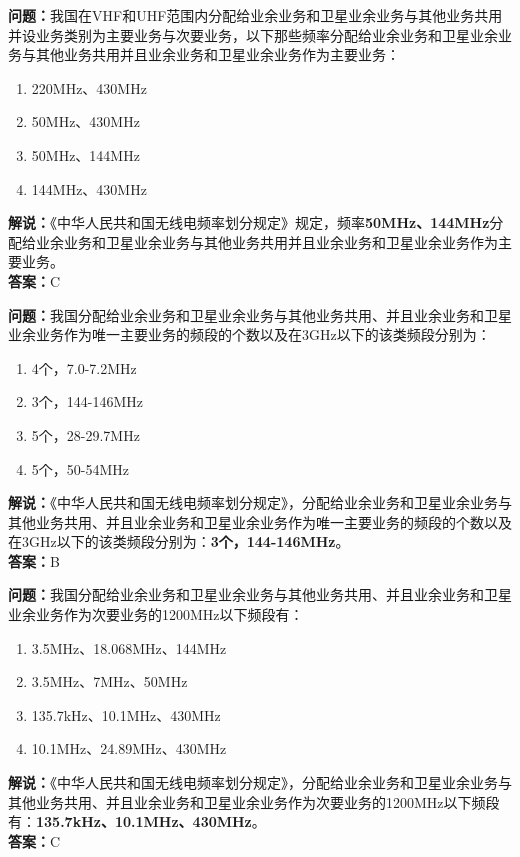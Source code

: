 \documentclass{ctexbook}
\begin{document}
\bigskip


\noindent\textbf{问题：}我国在VHF和UHF范围内分配给业余业务和卫星业余业务与其他业务共用并设业务类别为主要业务与次要业务，以下那些频率分配给业余业务和卫星业余业务与其他业务共用并且业余业务和卫星业余业务作为主要业务： 
\begin{enumerate}[label=\Alph*), leftmargin=3em]
	\item 220MHz、430MHz
	\item 50MHz、430MHz
	\item 50MHz、144MHz
	\item 144MHz、430MHz
\end{enumerate}
\noindent\textbf{解说：}《中华人民共和国无线电频率划分规定》规定，频率\textbf{50MHz、144MHz}分配给业余业务和卫星业余业务与其他业务共用并且业余业务和卫星业余业务作为主要业务。\\\noindent\textbf{答案：}C


\bigskip


\noindent\textbf{问题：}我国分配给业余业务和卫星业余业务与其他业务共用、并且业余业务和卫星业余业务作为唯一主要业务的频段的个数以及在3GHz以下的该类频段分别为：
\begin{enumerate}[label=\Alph*), leftmargin=3em]
	\item 4个，7.0-7.2MHz
	\item 3个，144-146MHz
	\item 5个，28-29.7MHz
	\item 5个，50-54MHz
\end{enumerate}
\noindent\textbf{解说：}《中华人民共和国无线电频率划分规定》，分配给业余业务和卫星业余业务与其他业务共用、并且业余业务和卫星业余业务作为唯一主要业务的频段的个数以及在3GHz以下的该类频段分别为：\textbf{3个，144-146MHz}。\\\noindent\textbf{答案：}B


\bigskip


\noindent\textbf{问题：}我国分配给业余业务和卫星业余业务与其他业务共用、并且业余业务和卫星业余业务作为次要业务的1200MHz以下频段有：
\begin{enumerate}[label=\Alph*), leftmargin=3em]
	\item 3.5MHz、18.068MHz、144MHz
	\item 3.5MHz、7MHz、50MHz
	\item 135.7kHz、10.1MHz、430MHz
	\item 10.1MHz、24.89MHz、430MHz
\end{enumerate}
\noindent\textbf{解说：}《中华人民共和国无线电频率划分规定》，分配给业余业务和卫星业余业务与其他业务共用、并且业余业务和卫星业余业务作为次要业务的1200MHz以下频段有：\textbf{135.7kHz、10.1MHz、430MHz}。\\\noindent\textbf{答案：}C
\end{document}
